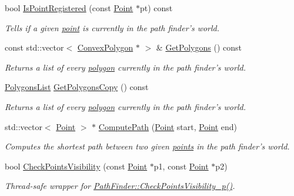 \begin{DoxyCompactItemize}
bool \hyperlink{classPathFinder_a6f0e23839f34803a1e712ff727ec734f}{IsPointRegistered} (const \hyperlink{structPathFinder_1_1Point}{Point} $\ast$pt) const 
\begin{DoxyCompactList}\small\item\em Tells if a given \hyperlink{structPathFinder_1_1Point}{point} is currently in the path finder's world. \item\end{DoxyCompactList}\item 
const std::vector$<$ \hyperlink{structPathFinder_1_1ConvexPolygon}{ConvexPolygon} $\ast$ $>$ \& \hyperlink{classPathFinder_a61256a9d84ff19f3471f0b22f69527e2}{GetPolygons} () const 
\begin{DoxyCompactList}\small\item\em Returns a list of every \hyperlink{structPathFinder_1_1ConvexPolygon}{polygon} currently in the path finder's world. \item\end{DoxyCompactList}\item 
\hyperlink{classPathFinder_a16ed073fa542c82fd09e582cb4fbed24}{PolygonsList} \hyperlink{classPathFinder_a1341f2c71d9984cc73719c8d9aa6aaa2}{GetPolygonsCopy} () const 
\begin{DoxyCompactList}\small\item\em Returns a list of every \hyperlink{structPathFinder_1_1ConvexPolygon}{polygon} currently in the path finder's world. \item\end{DoxyCompactList}\item 
std::vector$<$ \hyperlink{structPathFinder_1_1Point}{Point} $>$ $\ast$ \hyperlink{classPathFinder_a7d1904c4ee6abc79375356dc64cad995}{ComputePath} (\hyperlink{structPathFinder_1_1Point}{Point} start, \hyperlink{structPathFinder_1_1Point}{Point} end)
\begin{DoxyCompactList}\small\item\em Computes the shortest path between two given \hyperlink{structPathFinder_1_1Point}{points} in the path finder's world. \item\end{DoxyCompactList}\item 
bool \hyperlink{classPathFinder_a6d04d3b16677670873ea607c7966f49f}{CheckPointsVisibility} (const \hyperlink{structPathFinder_1_1Point}{Point} $\ast$p1, const \hyperlink{structPathFinder_1_1Point}{Point} $\ast$p2)
\begin{DoxyCompactList}\small\item\em Thread-\/safe wrapper for \hyperlink{classPathFinder_a12fb7b7f54766d8bbf5753a5a036a5f0}{PathFinder::CheckPointsVisibility\_\-p()}. \item\end{DoxyCompactList}\item 

\end{DoxyCompactItemize}
